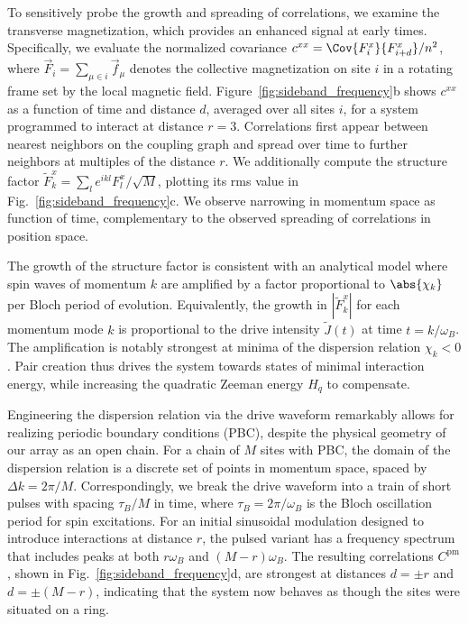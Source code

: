 \documentclass[aps,pra,twocolumn,superscriptaddress]{revtex4-1} %
\begin{document}
\begin{bibunit}
To sensitively probe the growth and spreading of correlations, we examine the transverse magnetization, which provides an enhanced signal at early times.  Specifically, we evaluate the normalized covariance ${c^{xx} = {\Cov{F^x_i}{F^x_{i + d}}}/n^2}$, where $\vec{F}_i = \sum_{\mu \in i} \vec{f}_\mu$ denotes the collective magnetization on site $i$ in a rotating frame set by the local magnetic field.  Figure~\ref{fig:sideband_frequency}b shows $c^{xx}$ as a function of time and distance $d$, averaged over all sites $i$, for a system programmed to interact at distance $r = 3$.  Correlations first appear between nearest neighbors on the coupling graph and spread over time to further neighbors at multiples of the distance $r$. We additionally compute the structure factor $\tilde{F}^x_k = \sum_l e^{i k l}F^x_l/\sqrt{M}$, plotting its rms value in Fig.~\ref{fig:sideband_frequency}c.  We observe narrowing in momentum space as function of time, complementary to the observed spreading of correlations in position space.

The growth of the structure factor is consistent with an analytical model where spin waves of momentum $k$ are amplified by a factor proportional to $\abs{\chi_k}$ per Bloch period of evolution.  Equivalently, the growth in $|\tilde{F}_k^x|$ for each momentum mode $k$ is proportional to the drive intensity $\tilde{J}(t)$ at time $t=k/\omega_B$.  The amplification is notably strongest at minima of the dispersion relation $\chi_k < 0$. Pair creation thus drives the system towards states of minimal interaction energy, while increasing the quadratic Zeeman energy $H_q$ to compensate.

Engineering the dispersion relation via the drive waveform remarkably allows for realizing periodic boundary conditions (PBC), despite the physical geometry of our array as an open chain.  For a chain of $M$ sites with PBC, the domain of the dispersion relation is a discrete set of points in momentum space, spaced by $\Delta k = 2\pi/M$.  Correspondingly, we break the drive waveform into a train of short pulses with spacing $\tau_B/M$ in time, where $\tau_B = 2\pi/\omega_B$ is the Bloch oscillation period for spin excitations. For an initial sinusoidal modulation designed to introduce interactions at distance $r$, the pulsed variant has a frequency spectrum that includes peaks at both $r\omega_B$ and $(M - r)\omega_B$.  The resulting correlations $C^\mathrm{pm}$, shown in Fig.~\ref{fig:sideband_frequency}d, are strongest at distances $d=\pm r$ and $d = \pm (M-r)$, indicating that the system now behaves as though the sites were situated on a ring.


\end{bibunit}
\end{document}
